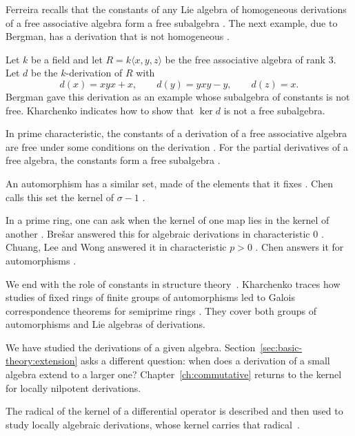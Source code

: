 Ferreira recalls that the constants of any Lie algebra of homogeneous
derivations of a free associative algebra form a free subalgebra
\cite[p.~177]{Ferreira2002}. The next example, due to Bergman, has a
derivation that is not homogeneous \cite[p.~177]{Ferreira2002}.

\begin{example}\label{ex:basic:bergman}
Let $k$ be a field and let $R=k\langle x,y,z\rangle$ be the free associative
algebra of rank $3$. Let $d$ be the $k$-derivation of $R$ with
\[
d(x)=xyx+x,\qquad d(y)=yxy-y,\qquad d(z)=x .
\]
Bergman gave this derivation as an example whose subalgebra of constants is not
free. Kharchenko indicates how to show that $\ker d$ is not a free subalgebra.
\end{example}

In prime characteristic, the constants of a derivation of a free associative
algebra are free under some conditions on the derivation
\cite[p.~177]{Ferreira2002}. For the partial derivatives of a free algebra,
the constants form a free subalgebra \cite[p.~177]{Ferreira2002}.

An automorphism has a similar set, made of the elements that it fixes
\cite[p.~1365]{Chen2011}. Chen calls this set the kernel of $\sigma-1$
\cite[p.~1365]{Chen2011}.

In a prime ring, one can ask when the kernel of one map lies in the kernel of
another \cite[p.~1365]{Chen2011}. Bre\v{s}ar answered this for algebraic
derivations in characteristic $0$ \cite[p.~1365]{Chen2011}. Chuang, Lee and
Wong answered it in characteristic $p>0$ \cite[p.~1365]{Chen2011}. Chen
answers it for automorphisms \cite[Theorem~1.1, p.~1366]{Chen2011}.

We end with the role of constants in structure theory~\cite[Introduction]{Kharchenko1991}. Kharchenko traces how
studies of fixed rings of finite groups of automorphisms led to Galois
correspondence theorems for semiprime rings
\cite[Introduction]{Kharchenko1991}. They cover both groups of automorphisms
and Lie algebras of derivations.

We have studied the derivations of a given algebra.
Section~\ref{sec:basic-theory:extension} asks a different question: when does
a derivation of a small algebra extend to a larger one?
Chapter~\ref{ch:commutative} returns to the kernel for locally nilpotent
derivations.

The radical of the kernel of a differential operator is described and then
used to study locally algebraic derivations, whose kernel carries that
radical~\cite{WlTheRadicalOf2017}.
